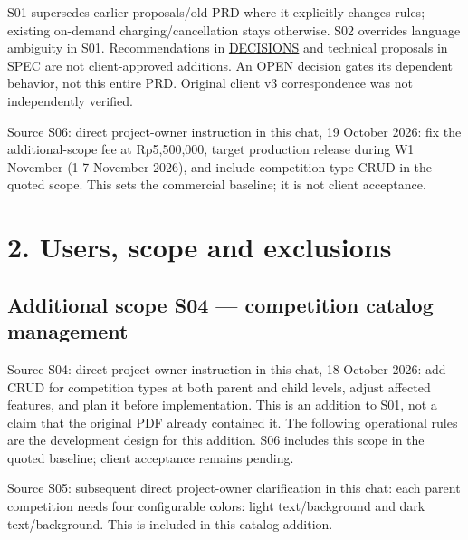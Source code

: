 \documentclass[11pt,a4paper]{article}
\begin{document}
S01 supersedes earlier proposals/old PRD where it explicitly changes rules; existing on-demand charging/cancellation stays otherwise. S02 overrides language ambiguity in S01. Recommendations in \href{../../docs/client/RELEASE-V3-DECISIONS.md}{DECISIONS} and technical proposals in \href{../../docs/plans/active/RELEASE-V3-SPEC.md}{SPEC} are not client-approved additions. An OPEN decision gates its dependent behavior, not this entire PRD. Original client v3 correspondence was not independently verified.

Source S06: direct project-owner instruction in this chat, 19 October 2026: fix the additional-scope fee at Rp5,500,000, target production release during W1 November (1-7 November 2026), and include competition type CRUD in the quoted scope. This sets the commercial baseline; it is not client acceptance.

\section{2. Users, scope and exclusions}\label{users-scope-and-exclusions}

\subsection{Additional scope S04 --- competition catalog management}\label{additional-scope-s04-competition-catalog-management}

Source S04: direct project-owner instruction in this chat, 18 October 2026: add CRUD for competition types at both parent and child levels, adjust affected features, and plan it before implementation. This is an addition to S01, not a claim that the original PDF already contained it. The following operational rules are the development design for this addition. S06 includes this scope in the quoted baseline; client acceptance remains pending.

Source S05: subsequent direct project-owner clarification in this chat: each parent competition needs four configurable colors: light text/background and dark text/background. This is included in this catalog addition.
\end{document}

